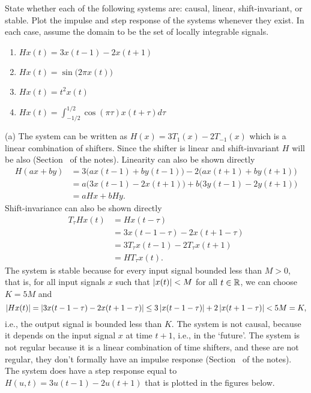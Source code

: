 \begin{excersizelist}
\item State whether each of the following systems are: causal, linear, shift-invariant, or stable.  Plot the impulse and step response of the systems whenever they exist.  In each case, assume the domain to be the set of locally integrable signals.
\begin{enumerate}
\item $Hx(t) = 3x(t - 1) - 2x(t+1)$
\item $Hx(t) = \sin\big(2\pi x(t)\big)$
\item $Hx(t) = t^2 x(t)$
\item $Hx(t) = \int_{-1/2}^{1/2} \cos(\pi\tau) x(t + \tau) d\tau$
\end{enumerate}

\begin{solution}

(a) The system can be written as $H(x) = 3T_{1}(x) - 2T_{-1}(x)$ which is a linear combination of shifters.  Since the shifter is linear and shift-invariant $H$ will be also (Section~ of the notes).  Linearity can also be shown directly
\begin{align*}
H(ax + by)  &= 3\big( a x(t-1) + by(t-1) \big)  - 2\big( a x(t+1) + by(t+1) \big) \\
&= a\big(3x(t-1)-2x(t+1)\big) + b\big(3y(t-1)-2y(t+1)\big) \\
&= aHx + bHy.
\end{align*}
Shift-invariance can also be shown directly
\begin{align*}
T_\tau Hx(t) &= H x(t-\tau) \\
&= 3x(t-1-\tau)  - 2x(t+1-\tau) \\
&= 3T_\tau x(t-1)  - 2T_\tau x(t+1) \\
&= HT_\tau x(t).
\end{align*}
The system is stable because for every input signal bounded less than $M > 0$, that is, for all input signals $x$ such that $\left\vert x(t) \right\vert < M$ for all $t \in {\mathbb R}$, we can choose $K = 5M$ and
\[
\vert Hx(t) \vert = \vert 3x(t-1-\tau)  - 2x(t+1-\tau) \vert \leq 3\left\vert x(t-1-\tau) \right\vert + 2\left\vert x(t+1-\tau) \right\vert  < 5M = K,
\]
i.e., the output signal is bounded less than $K$.  The system is not causal, because it depends on the input signal $x$ at time $t+1$, i.e., in the `future'.  The system is not regular because it  is a linear combination of time shifters, and these are not regular, they don't formally have an impulse response (Section~ of the notes).  The system does have a step response equal to $H(u,t) = 3u(t-1)  - 2u(t+1)$ that is plotted in the figures below.


\end{solution}
\end{excersizelist}
